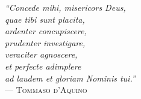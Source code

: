 {\sffamily\itshape
``Concede mihi, misericors Deus,\\
quae tibi sunt placita,\\
ardenter concupiscere,\\
prudenter investigare,\\
veraciter agnoscere,\\
et perfecte adimplere\\
ad laudem et gloriam Nominis tui.''\\}
--- \textsc{Tommaso d'Aquino}
